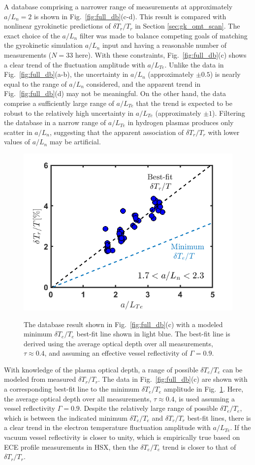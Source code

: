 \documentclass[%
 aip,
 amsmath,amssymb,
 reprint,%
]{revtex4-1}
\begin{document}
A database comprising a narrower range of measurements at approximately $a/L_n=2$ is shown in Fig.\ \ref{fig:full_db}(c-d). This result is compared with nonlinear gyrokinetic predictions of $\delta T_r/T_r$ in Section \ref{sec:gk_omt_scan}. The exact choice of the $a/L_n$ filter was made to balance competing goals of matching the gyrokinetic simulation $a/L_n$ input and having a reasonable number of measurements ($N=33$ here). With these constraints, Fig.\ \ref{fig:full_db}(c) shows a clear trend of the fluctuation amplitude with $a/L_{Te}$. Unlike the data in Fig.\ \ref{fig:full_db}(a-b), the uncertainty in $a/L_n$ (approximately $\pm0.5$) is nearly equal to the range of $a/L_n$ considered, and the apparent trend in Fig.\ \ref{fig:full_db}(d) may not be meaningful. On the other hand, the data comprise a sufficiently large range of $a/L_{Te}$ that the trend is expected to be robust to the relatively high uncertainty in $a/L_{Te}$ (approximately $\pm1$). Filtering the database in a narrow range of $a/L_{Te}$ in hydrogen plasmas produces only scatter in $a/L_n$, suggesting that the apparent association of $\delta T_r/T_r$  with lower values of $a/L_n$ may be artificial.

\begin{figure}[!htbp]
  \centering
  {\includegraphics[width=.45\textwidth]{Figures/dB_dTe.png}}
\hfill

\caption{The database result shown in Fig.\ \ref{fig:full_db}(c) with a modeled minimum $\delta T_e/T_e$ best-fit line shown in light blue. The best-fit line is derived using the average optical depth over all measurements, $\tau\approx0.4$, and assuming an effective vessel reflectivity of $\Gamma=0.9$.}
  \label{fig:dB_dTe}
\end{figure}

With knowledge of the plasma optical depth, a range of possible $\delta T_e/T_e$  can be modeled from measured $\delta T_r/T_r$. The data in Fig.\ \ref{fig:full_db}(c) are shown with a corresponding best-fit line to the minimum $\delta T_e/T_e$ amplitude in Fig.\ \ref{fig:dB_dTe}. Here, the average optical depth over all measurements, $\tau\approx0.4$, is used assuming a vessel reflectivity $\Gamma=0.9$. Despite the relatively large range of possible $\delta T_e/T_e$, which is between the indicated minimum $\delta T_e/T_e$ and $\delta T_r/T_r$ best-fit lines, there is a clear trend in the electron temperature fluctuation amplitude with $a/L_{Te}$. If the vacuum vessel reflectivity is closer to unity, which is empirically true based on ECE profile measurements in HSX, then the $\delta T_e/T_e$ trend is closer to that of $\delta T_r/T_r$.
\end{document}

